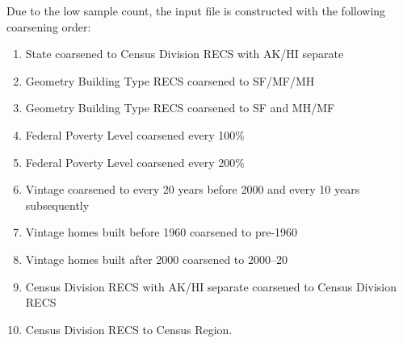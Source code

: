 Due to the low sample count, the input file is constructed with the following coarsening order:
\begin{enumerate}
    \item State coarsened to Census Division RECS with AK/HI separate 
    \item Geometry Building Type RECS coarsened to SF/MF/MH 
    \item  Geometry Building Type RECS coarsened to SF and MH/MF
    \item Federal Poverty Level coarsened every 100\% 
    \item Federal Poverty Level coarsened every 200\% 
    \item Vintage coarsened to every 20 years before 2000 and every 10 years subsequently
    \item  Vintage homes built before 1960 coarsened to pre-1960 
    \item  Vintage homes built after 2000 coarsened to 2000--20 
    \item  Census Division RECS with AK/HI separate coarsened to Census Division RECS 
    \item Census Division RECS to Census Region.
\end{enumerate}
